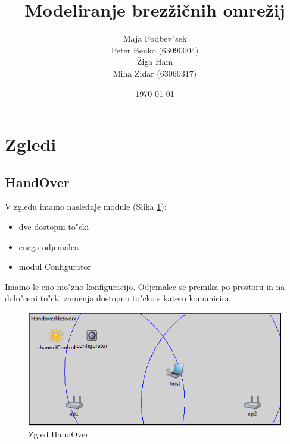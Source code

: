 \documentclass[a4paper,11pt]{article}
\title{Modeliranje brez\v{z}i\v{c}nih omre\v{z}ij}
\author{
    Maja Podbev"sek\\
    Peter Benko (63090004)\\
    \v{Z}iga Ham\\
    Miha Zidar (63060317)
}
\date{\today}
\begin{document}
\maketitle

\pagebreak

\tableofcontents

\pagebreak

\section{Zgledi}



\subsection{HandOver}

V zgledu imamo naslednje module (Slika \ref{image:handover}):

\begin{itemize}
    \item dve dostopni to"cki
    \item enega odjemalca
    \item modul Configurator
\end{itemize}

Imamo le eno mo"zno konfiguracijo. Odjemalec se premika po prostoru in na dolo"ceni to"cki zamenja dostopno to"cko s katero komunicira. 

\begin{figure}[htbp]
    \begin{center}
        \includegraphics[scale=0.8]{img/zgledi/handover.png}
        \caption{Zgled HandOver}
        \label{image:handover}
    \end{center}
\end{figure}

\end{document}
